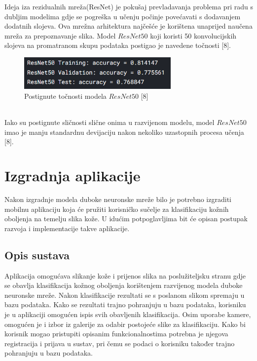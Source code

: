 \documentclass[times, utf8, zavrsni]{fer}
\begin{document}
Ideja iza rezidualnih mreža(ResNet) je pokušaj prevladavanja problema pri radu s dubljim modelima gdje se pogreška u učenju počinje povećavati s dodavanjem dodatnih slojeva. Ova mrežna arhitektura najčešće je korištena unaprijed naučena mreža za prepoznavanje slika. Model $ResNet50$ koji koristi 50 konvolucijskih slojeva na promatranom skupu podataka postigao je navedene točnosti [8].
%
\begin{figure}[!h]
\centering
\includegraphics[width=0.7\textwidth]{./slike/resnet}
\caption{Postignute točnosti modela $ResNet50$ [8]}
\label{fig:resnet}
\end{figure}
%
\\
Iako su postignute sličnosti slične onima u razvijenom modelu, model $ResNet50$ imao je manju standardnu devijaciju nakon nekoliko uzastopnih procesa učenja [8].


\chapter{Izgradnja aplikacije}
Nakon izgradnje modela duboke neuronske mreže bilo je potrebno izgraditi mobilnu aplikaciju koja će pružiti korisničko sučelje za klasifikaciju kožnih oboljenja na temelju slika kože. U idućim potpoglavljima bit će opisan postupak razvoja i implementacije takve aplikacije.

\section{Opis sustava}
Aplikacija omogućava slikanje kože i prijenos slika na poslužiteljsku stranu gdje se obavlja klasifikacija kožnog oboljenja korištenjem razvijenog modela duboke neuronske mreže. Nakon klasifikacije rezultati se s poslanom slikom spremaju u bazu podataka. Kako se rezultati trajno pohranjuju u bazu podataka, korisniku je u aplikaciji omogućen ispis svih obavljenih klasifikacija. Osim uporabe kamere, omogućen je i izbor iz galerije za odabir postojeće slike za klasifikaciju. Kako bi korisnik mogao pristupiti opisanim funkcionalnostima potrebna je njegova registracija i prijava u sustav, pri čemu se podaci o korisniku također trajno pohranjuju u bazu podataka. 
\end{document}
